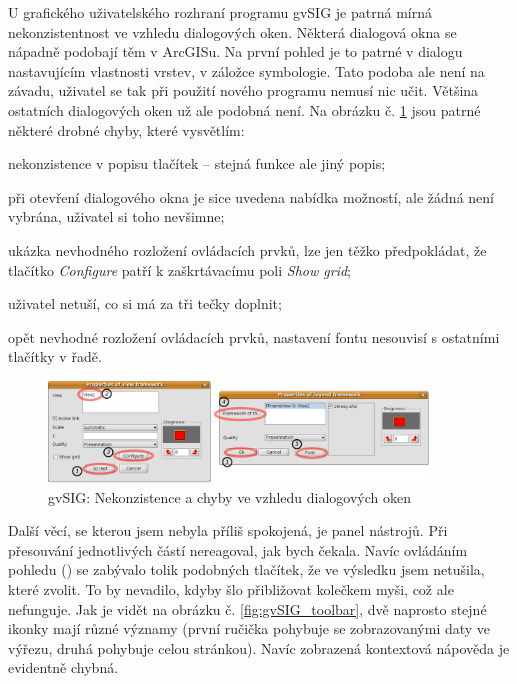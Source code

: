 \documentclass[a4paper,12pt,draft]{article}
\begin{document}
{U grafického uživatelského rozhraní programu gvSIG je patrná mírná
nekonzistentnost ve vzhledu dialogových oken. Některá dialogová okna se
nápadně podobají těm v ArcGISu. Na první pohled je to patrné v dialogu
nastavujícím vlastnosti vrstev, v záložce symbologie. Tato podoba ale
není na závadu, uživatel se tak při použití nového programu nemusí
nic učit. Většina ostatních dialogových oken už ale podobná není. Na
obrázku č. \ref{fig:gvSIG_dialogy} jsou patrné některé drobné chyby,
které vysvětlím:
\begin{inparaenum}[\itshape 1\upshape)]
\item nekonzistence v popisu tlačítek -- stejná funkce ale jiný popis;
\item při otevření dialogového okna je sice uvedena nabídka možností,
ale žádná není vybrána, uživatel si toho nevšimne;
\item ukázka nevhodného rozložení ovládacích prvků, lze jen těžko
předpokládat, že tlačítko \emph{Configure} patří k zaškrtávacímu
poli \emph{Show grid};
\item uživatel netuší, co si má za tři tečky doplnit;
\item opět nevhodné rozložení ovládacích prvků, nastavení fontu
nesouvisí s ostatními tlačítky v řadě.
\end{inparaenum}

\begin{figure}[h!]
\centering
\includegraphics[width=0.9\textwidth]{./GUI_screenshots/gvSIG_dialogy.png}
\caption{gvSIG: Nekonzistence a chyby ve vzhledu dialogových oken}
\label{fig:gvSIG_dialogy}
\end{figure}

Další věcí, se kterou jsem nebyla příliš spokojená, je panel
nástrojů. Při přesouvání jednotlivých částí nereagoval, jak bych
čekala. Navíc ovládáním pohledu () se zabývalo tolik
podobných tlačítek, že ve výsledku jsem netušila, které zvolit. To by
nevadilo, kdyby šlo přibližovat kolečkem myši, což ale nefunguje. Jak je
vidět na obrázku č. \ref{fig:gvSIG_toolbar}, dvě naprosto stejné ikonky
mají různé významy (první ručička pohybuje se zobrazovanými daty ve
výřezu, druhá pohybuje celou stránkou). Navíc zobrazená kontextová
nápověda je evidentně chybná.

}
\end{document}
